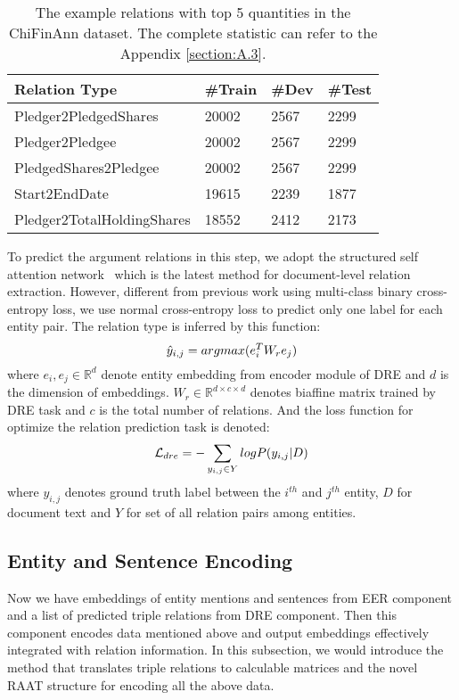 \documentclass[11pt]{article}
\begin{document}
\begin{table}
\centering\small
\begin{tabular}{|l|l|l|l|}
\hline
\textbf{Relation Type} & \textbf{\#Train} & \textbf{\#Dev} & \textbf{\#Test} \\
\hline
Pledger2PledgedShares & 20002 & 2567 & 2299 \\
\hline
Pledger2Pledgee & 20002 & 2567 & 2299 \\
\hline
PledgedShares2Pledgee & 20002 & 2567 & 2299 \\
\hline
Start2EndDate & 19615 & 2239 & 1877 \\
\hline
Pledger2TotalHoldingShares & 18552 & 2412 & 2173 \\
\hline
\end{tabular}
\caption{The example relations with top 5 quantities in the ChiFinAnn dataset. The complete statistic can refer to the Appendix \ref{section:A.3}.}
\label{tab:stats snippet}
\end{table}


To predict the argument relations in this step, we adopt the structured self attention network~\cite{SSAN} which is the latest method for document-level relation extraction. However, different from previous work using multi-class binary cross-entropy loss, we use normal cross-entropy loss to predict only one label for each entity pair. The relation type is inferred by this function:
\begin{equation}
\small
    \hat{y}_{i,j}= argmax(e_i^TW_re_j)
\end{equation}
where $e_i, e_j \in \mathbb{R}^d$ denote entity embedding from encoder module of DRE and $d$ is the dimension of embeddings. $W_r\in \mathbb{R}^{d \times c \times d}$ denotes biaffine matrix trained by DRE task and $c$ is the total number of relations.
And the loss function for optimize the relation prediction task is denoted:
\begin{equation}
\small
    \mathcal{L}_{dre}= -\sum_{y_{i,j} \in Y} logP(y_{i,j}|D)
\end{equation}
where $y_{i, j}$ denotes ground truth label between the $i^{th}$ and $j^{th}$ entity, $D$ for document text and $Y$ for set of all relation pairs among entities.

\subsection{Entity and Sentence Encoding}

Now we have embeddings of entity mentions and sentences from EER component and a list of predicted triple relations from DRE component. Then this component encodes data mentioned above and output embeddings effectively integrated with relation information. In this subsection, we would introduce the method that translates triple relations to calculable matrices and the novel RAAT structure for encoding all the above data.
\end{document}
